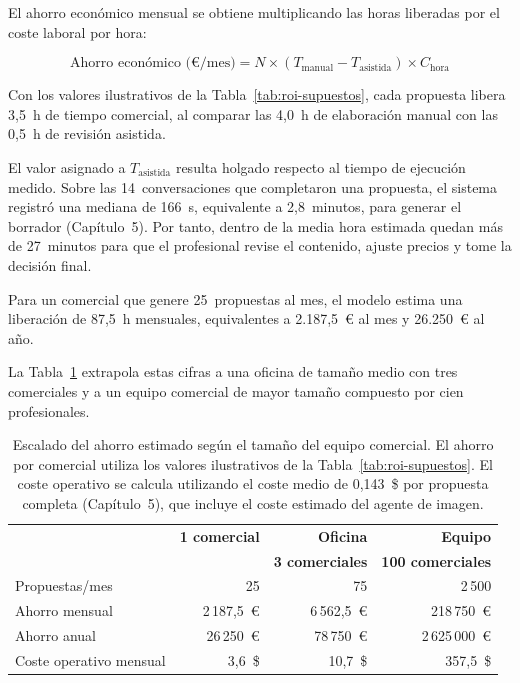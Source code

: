 El ahorro económico mensual se obtiene multiplicando las horas liberadas por el coste
laboral por hora:

\[
\text{Ahorro económico (€/mes)}
=
N
\times
\left(
T_{\text{manual}}
-
T_{\text{asistida}}
\right)
\times
C_{\text{hora}}
\]

Con los valores ilustrativos de la Tabla~\ref{tab:roi-supuestos}, cada propuesta libera
3,5~h de tiempo comercial, al comparar las 4,0~h de elaboración manual con las 0,5~h de
revisión asistida.

El valor asignado a $T_{\text{asistida}}$ resulta holgado respecto al tiempo de ejecución
medido. Sobre las 14~conversaciones que completaron una propuesta, el sistema registró
una mediana de 166~s, equivalente a 2,8~minutos, para generar el borrador
(Capítulo~5). Por tanto, dentro de la media hora estimada quedan más de 27~minutos para
que el profesional revise el contenido, ajuste precios y tome la decisión final.

Para un comercial que genere 25~propuestas al mes, el modelo estima una liberación de
87,5~h mensuales, equivalentes a 2.187,5~€ al mes y 26.250~€ al año.

La Tabla~\ref{tab:roi-escalado} extrapola estas cifras a una oficina de tamaño medio con
tres comerciales y a un equipo comercial de mayor tamaño compuesto por cien
profesionales.

\begin{table}[h!]
\centering
\begin{tabular}{@{}lrrr@{}}
\toprule
&
\textbf{1 comercial}
&
\textbf{Oficina}
&
\textbf{Equipo}
\\

&
&
\textbf{3 comerciales}
&
\textbf{100 comerciales}
\\
\midrule

Propuestas/mes
&
25
&
75
&
2\,500
\\

Ahorro mensual
&
2\,187,5~€
&
6\,562,5~€
&
218\,750~€
\\

Ahorro anual
&
26\,250~€
&
78\,750~€
&
2\,625\,000~€
\\

Coste operativo mensual
&
3,6~\$
&
10,7~\$
&
357,5~\$
\\

\bottomrule
\end{tabular}

\caption{Escalado del ahorro estimado según el tamaño del equipo comercial. El ahorro
por comercial utiliza los valores ilustrativos de la
Tabla~\ref{tab:roi-supuestos}. El coste operativo se calcula utilizando el coste medio
de 0,143~\$ por propuesta completa (Capítulo~5), que incluye el coste estimado del
agente de imagen.}

\label{tab:roi-escalado}
\end{table}

